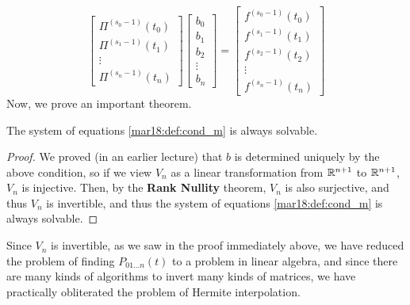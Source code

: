 \begin{equation}
  \label{mar18:def:cond_m}
  \begin{bmatrix}
    \Pi^{(s_0 - 1)}(t_0) \\
    \Pi^{(s_1 - 1)}(t_1) \\
    \vdots \\
    \Pi^{(s_n - 1)}(t_n)
  \end{bmatrix}
  \begin{bmatrix}b_0 \\ b_1 \\ b_2 \\ \vdots \\ b_n \end{bmatrix}
  =
  \begin{bmatrix}f^{(s_0 - 1)}(t_0) \\ f^{(s_1 - 1)}(t_1) \\ f^{(s_2 - 1)}(t_2) \\ \vdots \\ f^{(s_n - 1)}(t_n) \end{bmatrix}
\end{equation}
Now, we prove an important theorem.
\begin{thm}
  The system of equations \ref{mar18:def:cond_m} is always solvable.
\end{thm}
\begin{proof}
  We proved (in an earlier lecture) that $b$ is determined uniquely by the above condition, so if we view $V_n$ as a linear transformation from $\mathbb{R}^{n+1}$ to $\mathbb{R}^{n+1}$, $V_n$ is injective. Then, by the \textbf{Rank Nullity} theorem, $V_n$ is also surjective, and thus $V_n$ is invertible, and thus the system of equations \ref{mar18:def:cond_m} is always solvable.
  \hfill
\end{proof}
Since $V_n$ is invertible, as we saw in the proof immediately above, we have reduced the problem of finding $P_{01\dots n}(t)$ to a problem in linear algebra, and since there are many kinds of algorithms to invert many kinds of matrices, we have practically obliterated the problem of Hermite interpolation.

